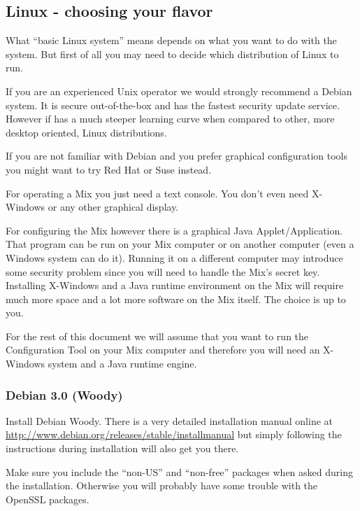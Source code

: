 \documentclass{article}
\begin{document}
\subsection{Linux - choosing your flavor}

What ``basic Linux system'' means depends on what you want to do with
the system. But first of all you may need to decide which distribution
of Linux to run.

If you are an experienced Unix operator we would strongly recommend a
Debian system. It is secure out-of-the-box and has the fastest
security update service. However if has a much steeper learning curve
when compared to other, more desktop oriented, Linux distributions.

If you are not familiar with Debian and you prefer graphical
configuration tools you might want to try Red Hat or Suse instead.

For operating a Mix you just need a text console. You don't even need
X-Windows or any other graphical display. 

For configuring the Mix however there is a graphical Java
Applet/Application. That program can be run on your Mix computer or on
another computer (even a Windows system can do it). Running it on a
different computer may introduce some security problem since you will
need to handle the Mix's secret key. Installing X-Windows and a Java
runtime environment on the Mix will require much more space and a lot
more software on the Mix itself. The choice is up to you.

For the rest of this document we will assume that you want to run the
Configuration Tool on your Mix computer and therefore you will need an
X-Windows system and a Java runtime engine. 


\subsubsection{Debian 3.0 (Woody)}

Install Debian Woody. There is a very detailed installation manual
online at \url{http://www.debian.org/releases/stable/installmanual}
but simply following the instructions during installation will also
get you there.

Make sure you include the ``non-US'' and ``non-free'' packages when
asked during the installation. Otherwise you will probably have some
trouble with the OpenSSL packages.
\end{document}

